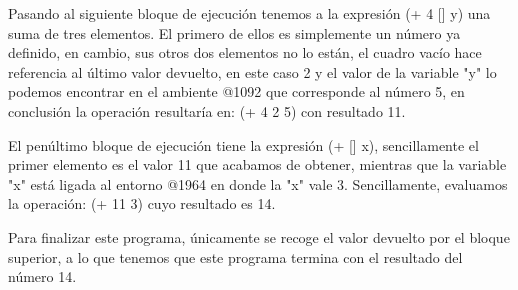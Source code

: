 \documentclass{article}
\begin{document}
Pasando al siguiente bloque de ejecución tenemos a la expresión (+ 4 [] y) una suma de tres 
elementos. El primero de ellos es simplemente un número ya definido, en cambio, sus otros dos 
elementos no lo están, el cuadro vacío hace referencia al último valor devuelto, en este caso 2 
y el valor de la variable "y" lo podemos encontrar en el ambiente @1092 que corresponde al 
número 5, en conclusión la operación resultaría en: (+ 4 2 5) con resultado 11.

El penúltimo bloque de ejecución tiene la expresión (+ [] x), sencillamente el primer elemento es 
el valor 11 que acabamos de obtener, mientras que la variable "x" está ligada al entorno @1964 en 
donde la "x" vale 3. Sencillamente, evaluamos la operación: (+ 11 3) cuyo resultado es 14.
	
Para finalizar este programa, únicamente se recoge el valor devuelto por el bloque superior, a lo 
que tenemos que este programa termina con el resultado del número 14.
\end{document}
